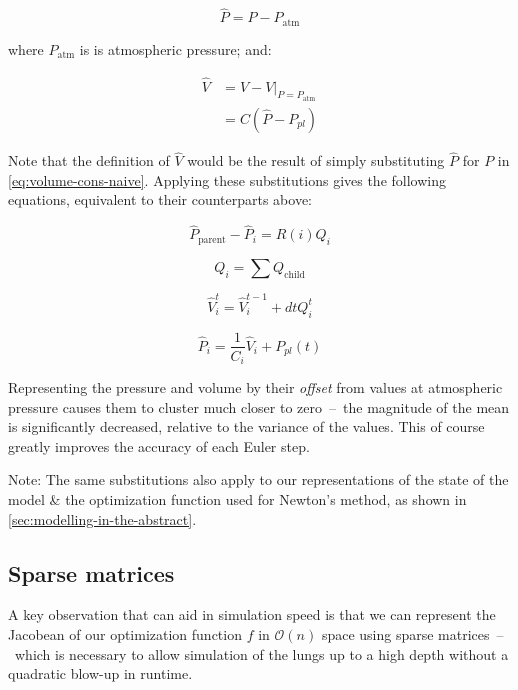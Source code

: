\begin{equation}
    \hat{P} = P - P_{\text{atm}}
\end{equation}

\noindent
where $P_{\text{atm}}$ is is atmospheric pressure; and:

\begin{align}
    \hat{V} & = V - V \vert_{P = P_{\text{atm}}} \\
            & = C (\hat{P} - P_{pl})
\end{align}

\noindent
Note that the definition of $\hat{V}$ would be the result of simply substituting $\hat{P}$ for $P$
in \ref{eq:volume-cons-naive}. Applying these substitutions gives the following
equations, equivalent to their counterparts above:

\begin{equation}
    \hat{P}_{\text{parent}} - \hat{P}_i = R(i) Q_i
\end{equation}

\begin{equation}
    Q_i = \sum Q_{\text{child}}
\end{equation}

\begin{equation}
    \hat{V}_i^t = \hat{V}_i^{t-1} + dt Q_i^t
\end{equation}

\begin{equation}
    \hat{P}_i = \frac{1}{C_i} \hat{V}_i + P_{pl}(t)
\end{equation}

Representing the pressure and volume by their \textit{offset} from values at atmospheric pressure
causes them to cluster much closer to zero~--~the magnitude of the mean is significantly decreased,
relative to the variance of the values. This of course greatly improves the accuracy of each Euler
step.

Note: The same substitutions also apply to our representations of the state of the model \& the
optimization function used for Newton's method, as shown in \autoref{sec:modelling-in-the-abstract}.

\subsection{Sparse matrices}

A key observation that can aid in simulation speed is that we can represent the Jacobean of our
optimization function $f$ in $\mathcal{O}(n)$ space using sparse matrices~--~which is necessary to
allow simulation of the lungs up to a high depth without a quadratic blow-up in runtime.


